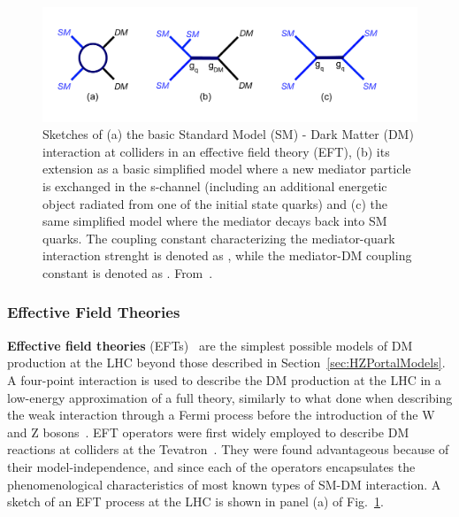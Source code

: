 \begin{figure}[!htpb]
\includegraphics[width=\textwidth]{figures/MonoX.pdf}
\caption{Sketches of (a) the basic Standard Model (SM) - Dark Matter (DM) interaction at colliders in an effective field theory (EFT), (b) its extension as a basic simplified model where a new mediator particle is exchanged in the s-channel (including an additional energetic object radiated from one of the initial state quarks) and (c) the same simplified model where the mediator decays back into SM quarks. The coupling constant characterizing the mediator-quark interaction strenght is denoted as \gq, while the mediator-DM coupling constant is denoted as \gdm. From~\cite{monoXfig}.}
\label{fig:monoX}
\end{figure}

\subsubsection{Effective Field Theories}
\label{sub:EFT}

\textbf{Effective field theories} (EFTs)~\cite{Goodman:2010ku, Shoemaker:2011vi} are the simplest possible models of DM production at the LHC beyond those described in Section~\ref{sec:HZPortalModels}. A four-point interaction is used to describe the DM production at the LHC in a low-energy approximation of a full theory, similarly to what done when describing the weak interaction through a Fermi process before the introduction of the W and Z bosons~\cite{Fermi2008}. EFT operators were first widely employed to describe DM reactions at colliders at the Tevatron~\cite{Bai:2010hh,Beltran:2010ww}. They were found advantageous because of their model-independence, and since each of the operators encapsulates the phenomenological characteristics of most known types of SM-DM interaction. A sketch of an EFT process at the LHC is shown in panel (a) of Fig.~\ref{fig:monoX}. 

